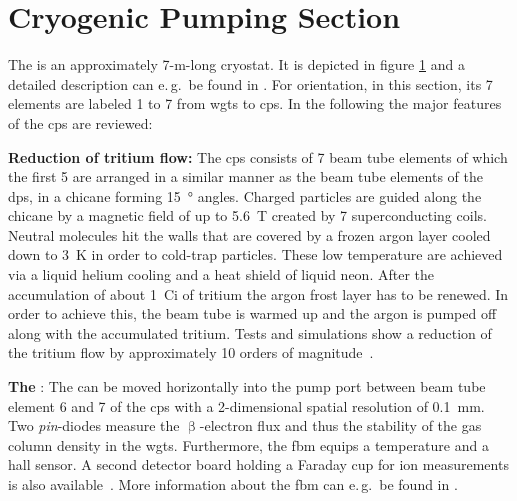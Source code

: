 \section{Cryogenic Pumping Section}
\label{sec:katrinExpSetupCryoPumpingSection}
\begin{figure}[t]
 \label{fig:katrinExpSetupCryoPumpingSection}
\end{figure}
The  is an approximately 7-m-long cryostat. It is depicted in figure \ref{fig:katrinExpSetupCryoPumpingSection} and a detailed description can e.\,g.~be found in \cite{Jansen2015}. For orientation, in this section, its 7 elements are labeled 1 to 7 from \gls{wgts} to \gls{cps}. In the following the major features of the \gls{cps} are reviewed:

{\par\textbf{Reduction of tritium flow:}
The \gls{cps} consists of 7 beam tube elements of which the first 5 are arranged in a similar manner as the beam tube elements of the \gls{dps}, in a chicane forming \SI{15}{\degree} angles. Charged particles are guided along the chicane by a magnetic field of up to \SI{5.6}{T} created by 7 superconducting coils. Neutral molecules hit the walls that are covered by a frozen argon layer cooled down to \SI{3}{K} in order to cold-trap particles. These low temperature are achieved via a liquid helium cooling and a heat shield of liquid neon. After the accumulation of about \SI{1}{Ci} of tritium the argon frost layer has to be renewed. In order to achieve this, the beam tube is warmed up and the argon is pumped off along with the accumulated tritium. Tests and simulations show a reduction of the tritium flow by approximately 10 orders of magnitude~\cite{Jansen2015}.}

{\par\textbf{The }: 
The  can be moved horizontally into the pump port between beam tube element 6 and 7 of the \gls{cps} with a 2-dimensional spatial resolution of \SI{0.1}{mm}. Two \textit{pin}-diodes measure the $\upbeta$-electron flux and thus the stability of the gas column density in the \gls{wgts}. Furthermore, the \gls{fbm} equips a temperature and a hall sensor. A second detector board holding a Faraday cup for ion measurements is also available~\cite{Klein2019}. More information about the \gls{fbm} can e.\,g.~be found in \cite{Ellinger2017}.}

